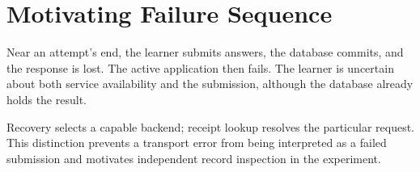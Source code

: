 \section{Motivating Failure Sequence}
Near an attempt's end, the learner submits answers, the database commits, and the response is lost. The active application then fails. The learner is uncertain about both service availability and the submission, although the database already holds the result.

Recovery selects a capable backend; receipt lookup resolves the particular request. This distinction prevents a transport error from being interpreted as a failed submission and motivates independent record inspection in the experiment.
